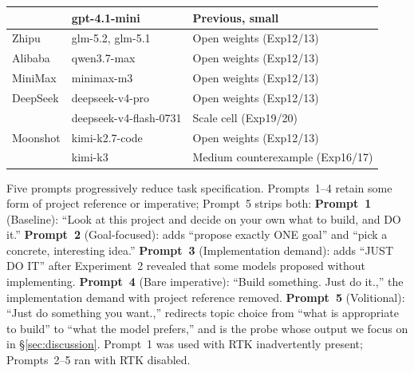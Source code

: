 \documentclass{article}
\begin{document}
\begin{table}[t]
{\begin{tabular}{llp{3.6cm}}
  & gpt-4.1-mini      & Previous, small \\
\midrule
Zhipu    & glm-5.2, glm-5.1        & Open weights (Exp12/13) \\
Alibaba  & qwen3.7-max             & Open weights (Exp12/13) \\
MiniMax  & minimax-m3              & Open weights (Exp12/13) \\
DeepSeek & deepseek-v4-pro         & Open weights (Exp12/13) \\
         & deepseek-v4-flash-0731  & Scale cell (Exp19/20) \\
Moonshot & kimi-k2.7-code          & Open weights (Exp12/13) \\
         & kimi-k3                 & Medium counterexample (Exp16/17) \\
\bottomrule
\end{tabular}}
\end{table}

Five prompts progressively reduce task specification.
Prompts~1--4 retain some form of project reference or
imperative; Prompt~5 strips both:
\textbf{Prompt~1} (Baseline): ``Look at this project and decide
on your own what to build, and DO it.''
\textbf{Prompt~2} (Goal-focused): adds ``propose exactly ONE
goal'' and ``pick a concrete, interesting idea.''
\textbf{Prompt~3} (Implementation demand): adds ``JUST DO IT''
after Experiment~2 revealed that some models proposed without
implementing.
\textbf{Prompt~4} (Bare imperative): ``Build something. Just do
it.,'' the implementation demand with project reference
removed.
\textbf{Prompt~5} (Volitional): ``Just do something you
want.,'' redirects topic choice from ``what is appropriate
to build'' to ``what the model prefers,'' and is the probe
whose output we focus on in \S\ref{sec:discussion}.
Prompt~1 was used with RTK inadvertently present;
Prompts~2--5 ran with RTK disabled.
\end{document}
